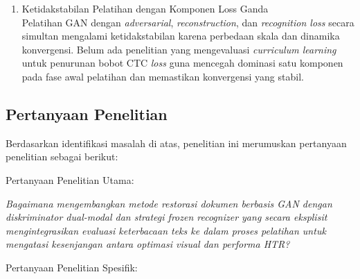 \documentclass[12pt,a4paper]{article}
\begin{document}
\begin{enumerate}[leftmargin=1.5em, labelsep=0.5em, itemindent=0pt, noitemsep, topsep=0pt]
      \item Ketidakstabilan Pelatihan dengan Komponen Loss Ganda \\
            Pelatihan GAN dengan \textit{adversarial}, \textit{reconstruction}, dan \textit{recognition loss} secara simultan mengalami ketidakstabilan karena perbedaan skala dan dinamika konvergensi. Belum ada penelitian yang mengevaluasi \textit{curriculum learning} untuk penurunan bobot CTC \textit{loss} guna mencegah dominasi satu komponen pada fase awal pelatihan dan memastikan konvergensi yang stabil.

\end{enumerate}


\subsection{Pertanyaan Penelitian}
\label{subsec:pertanyaan-penelitian}

Berdasarkan identifikasi masalah di atas, penelitian ini merumuskan pertanyaan penelitian sebagai berikut:


Pertanyaan Penelitian Utama:

\textit{Bagaimana mengembangkan metode restorasi dokumen berbasis GAN dengan diskriminator dual-modal dan strategi \textit{frozen recognizer} yang secara eksplisit mengintegrasikan evaluasi keterbacaan teks ke dalam proses pelatihan untuk mengatasi kesenjangan antara optimasi visual dan performa HTR?}


Pertanyaan Penelitian Spesifik:
\end{document}
